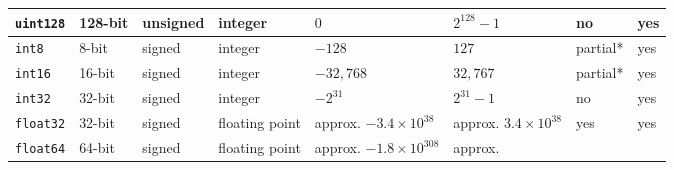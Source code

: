 \documentclass{bmcart}
\begin{document}
\begin{backmatter}
\begin{table}[h!]
\begin{tabular}{| l | l | l | p{0.4in} | p{0.8in} | p{0.8in} | l | l |}
      \texttt{uint128}         & 128-bit            & unsigned            & integer         & $0$                     & $2^{128} - 1$          & no                  & yes               \\ \hline
      \texttt{int8}            & 8-bit              & signed              & integer         & $-128$                  & $127$                  & partial*            & yes               \\ \hline
      \texttt{int16}           & 16-bit             & signed              & integer         & $-32,768$               & $32,767$               & partial*            & yes               \\ \hline
      \texttt{int32}           & 32-bit             & signed              & integer         & $-2^{31}$               & $2^{31} - 1$           & no                  & yes               \\ \hline
      \texttt{float32}         & 32-bit             & signed              & floating point  & \parbox[t]{0.8in}{
                                                                                              approx.\\
                                                                                              $-3.4 \times 10^{38}$
                                                                                              }                       & \parbox[t]{0.8in}{
                                                                                                                        approx.\\
                                                                                                                        $3.4 \times 10^{38}$
                                                                                                                        }                      & yes                 & yes               \\ \hline
      \texttt{float64}         & 64-bit             & signed              & floating point  & \parbox[t]{0.8in}{
                                                                                              approx.\\
                                                                                              $-1.8 \times 10^{308}$
                                                                                              }                       & \parbox[t]{0.8in}{
                                                                                                                        approx.\\
}
\end{tabular}
\end{table}
\end{backmatter}
\end{document}
